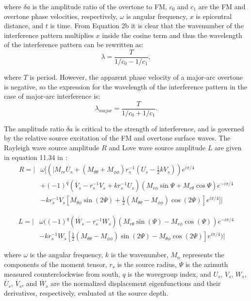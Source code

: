\documentclass[extra,mreferee]{gji}
\begin{document}
where $\delta a$ is the amplitude ratio of the overtone to FM, $c_0$ and $c_1$ are the FM and overtone phase velocities, respectively, $\omega$ is angular frequency,  $x$ is epicentral distance, and $t$ is time.
From Equation 2b it is clear that the wavenumber of the interference pattern multiplies $x$ inside the cosine term and thus the wavelength of the interference pattern can be rewritten as:
\begin{equation}
\lambda = \frac{T}{1/c_0-1/c_1},
\end{equation}

where $T$ is period. However, the apparent phase velocity of a major-arc overtone is negative, so  the expression for the wavelength of the interference pattern in the case of major-arc interference is:
\begin{equation}
\lambda_{major} = \frac{T}{1/c_0+1/c_1}. 
\end{equation}

The amplitude ratio $\delta a$ is critical to the strength of interference, and is governed by the relative source excitation of the FM and overtone surface waves. The Rayleigh wave source amplitude $R$ and Love wave source amplitude $L$ are given in equation 11.34 in \cite{dahlen1998theoretical}:
\begin{equation}
 \begin{aligned}
 R = |{} & \omega[(|M_{rr} \dot{U_s} + (M_{\theta \theta} + M_{\phi \phi}) r_s^{-1}(U_s-\frac{1}{2} kV_s)) e^{i \pi/4}  \\ & + (-1)^q (\dot{V_s} - r^{-1}_s V_s + k r^{-1}_s U_s)(M_{r \phi} \sin \Psi + M_{r \theta} \cos \Psi) e^{-i \pi/4}  \\ & - k r^{-1}_s V_s[M_{\theta \phi} \sin(2 \Psi) + \frac{1}{2}(M_{\theta \theta}-M_{\phi \phi}) \cos(2 \Psi)] e^{i \pi/4}]|
 \end{aligned}
\end{equation} 

\begin{equation}
\begin{aligned}
L = |{} & \omega((-1)^q (\dot{W_s} - r^{-1}_s W_s)(M_{r\theta} \sin(\Psi) - M_{r \phi} \cos(\Psi)) e^{-i \pi/4}  \\
& - k r^{-1}_s W_s [\frac{1}{2} (M_{\theta \theta} - M_{\phi\phi}) \sin (2 \Psi) - M_{\theta \phi} \cos (2 \Psi)]e^{i \pi/4})|
\end{aligned}
\end{equation}

where $\omega$ is the angular frequency, $k$ is the wavenumber,  $M_n$ represents the components of the moment tensor, $r_s$ is the source radius, $\Psi$ is the azimuth measured counterclockwise from south, $q$ is the wavegroup index, and $U_s$, $V_s$, $W_s$, $\dot{U_s}$, $\dot{V_s}$, and $\dot{W_s}$ are the normalized displacement eigenfunctions and their derivatives, respectively, evaluated at the source depth.
\end{document}
